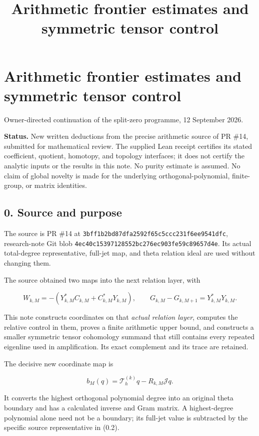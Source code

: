 \documentclass[
]{article}
\title{Arithmetic frontier estimates and symmetric tensor control}
\author{}
\date{}
\begin{document}
\maketitle

\section{Arithmetic frontier estimates and symmetric tensor
control}\label{arithmetic-frontier-estimates-and-symmetric-tensor-control}

Owner-directed continuation of the split-zero programme, 12 September
2026.

\textbf{Status.} New written deductions from the precise arithmetic
source of PR \#14, submitted for mathematical review. The supplied Lean
receipt certifies its stated coefficient, quotient, homotopy, and
topology interfaces; it does not certify the analytic inputs or the
results in this note. No purity estimate is assumed. No claim of global
novelty is made for the underlying orthogonal-polynomial, finite-group,
or matrix identities.

\subsection{0. Source and purpose}\label{source-and-purpose}

The source is PR \#14 at
\texttt{3bff1b2bd87dfa2592f65c5ccc231f6ee9541dfc}, research-note Git
blob \texttt{4ec40c15397128552bc276ec903fe59c89657d4e}. Its actual
total-degree representative, full-jet map, and theta relation ideal are
used without changing them.

The source obtained two maps into the next relation layer, with

\[W_{k,M}=-(Y_{k,M}^*C_{k,M}+C_{k,M}^*Y_{k,M}),\qquad
G_{k,M}-G_{k,M+1}=Y_{k,M}^*Y_{k,M}.\tag{0.1}\]

This note constructs coordinates on that \emph{actual relation layer},
computes the relative control in them, proves a finite arithmetic upper
bound, and constructs a smaller symmetric tensor cohomology summand that
still contains every repeated eigenline used in amplification. Its exact
complement and its trace are retained.

The decisive new coordinate map is

\[\boxed{b_M(q)=\mathcal T_h^{(k)}q-R_{k,M}\mathcal Jq.}\tag{0.2}\]

It converts the highest orthogonal polynomial degree into an original
theta boundary and has a calculated inverse and Gram matrix. A
highest-degree polynomial alone need not be a boundary; its full-jet
value is subtracted by the specific source representative in (0.2).
\end{document}
